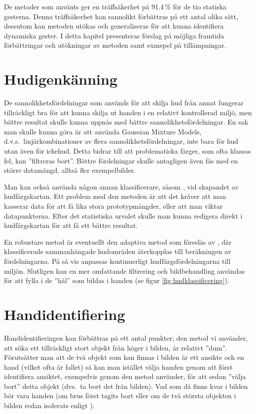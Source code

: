 \documentclass[../rapport_MVEX01-11-05]{subfiles}
\begin{document}
De metoder som använts ger en träffsäkerhet på 91.4\,\% för de tio statiska
gesterna. Denna träffsäkerhet kan sannolikt förbättras på ett antal
olika sätt, dessutom
kan metoden utökas och generaliseras för att kunna identifiera
dynamiska gester. I detta kapitel presenteras förslag på möjliga framtida
förbättringar och utökningar av metoden samt exmepel på tillämpningar.

\section{Hudigenkänning}
De sannolikhetsfördelningar som används för att skilja hud från annat
fungerar tillräckligt bra för att kunna skilja ut handen i en
relativt kontrollerad miljö, men bättre resultat skulle kunna uppnås
med bättre sannolikhetsfördelningar. En sak man skulle kunna göra
är att använda Gaussian Mixture Models, d.v.s.~linjärkombinationer av flera
sannolikhetsfördelningar, inte bara för hud utan även för ickehud.
Detta bidrar till att problematiska färger, som ofta klassas fel,
kan ''filtreras bort''.
Bättre fördelningar skulle
antagligen även fås med en större datamängd, alltså fler
exempelbilder.

Man kan också använda någon annan klassificerare, såsom \knn,
vid skapandet av hudfärgskartan. Ett problem med den metoden är att det
kräver att man kasserar data för att få lika stora prototypmängder,
eller att man viktar datapunkterna.
Efter det statistiska urvalet skulle man kunna redigera direkt i
hudfärgskartan för att få ett bättre resultat.

En robustare metod är eventuellt den adaptiva metod som föreslås av
, där klassificerade sammanhängade
hudområden återkopplas till beräkningen av fördelningarna.
På så vis anpassas kontinuerligt hudfärgsfördelningarna till miljön.
Slutligen kan en mer omfattande filtrering och bildbehandling användas
för att fylla i de ''hål'' som bildas i handen (se figur
\vref{fig:hudklassificering}).

\section{Handidentifiering}
Handidentifieringen kan förbättras på ett antal punkter;
den metod vi använder, att söka ett tillräckligt stort objekt från höger i
bilden, är relativt ''dum''. Förutsätter man att de två objekt som kan finnas
i bilden är ett ansikte och en hand (vilket ofta är fallet) så kan man
istället välja handen genom att först identifiera ansiktet, exempelvis genom
den metod  använder, för att sedan ''välja bort'' detta
objekt (dvs.~ta bort det från bilden). Vad som då finns kvar i bilden bör vara
handen (om brus först tagits bort eller om de två största
objekten i bilden redan isolerats enligt ).
\end{document}
